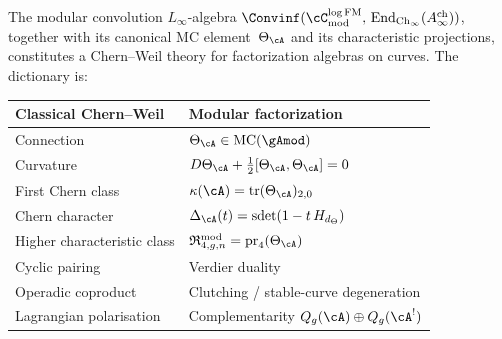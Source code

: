 \begin{remark}
\label{rem:ontological-shift}
\label{rem:modular-chern-weil}
The modular convolution $L_\infty$-algebra
$\Convinf(\cC^{\log\mathrm{FM}}_{\mathrm{mod}},\,
\operatorname{End}_{\mathrm{Ch}_\infty}(A^{\mathrm{ch}}_\infty))$,
together with its canonical MC element~$\Theta_\cA$ and its
characteristic projections, constitutes a Chern--Weil theory for
factorization algebras on curves.  The dictionary is:
\begin{center}
\renewcommand{\arraystretch}{1.2}
\begin{tabular}{ll}
\textbf{Classical Chern--Weil} & \textbf{Modular factorization} \\
\hline
Connection & $\Theta_\cA \in \mathrm{MC}(\gAmod)$ \\
Curvature & $D\Theta_\cA + \tfrac{1}{2}[\Theta_\cA,\Theta_\cA] = 0$ \\
First Chern class & $\kappa(\cA) = \operatorname{tr}(\Theta_\cA)_{2,0}$ \\
Chern character & $\Delta_\cA(t) = \operatorname{sdet}(1 - t\,H_{d_\Theta})$ \\
Higher characteristic class & $\mathfrak{R}^{\mathrm{mod}}_{4,g,n} = \operatorname{pr}_4(\Theta_\cA)$ \\
Cyclic pairing & Verdier duality \\
Operadic coproduct & Clutching / stable-curve degeneration \\
Lagrangian polarisation & Complementarity $Q_g(\cA) \oplus Q_g(\cA^!)$
\end{tabular}
\end{center}
\end{remark}

